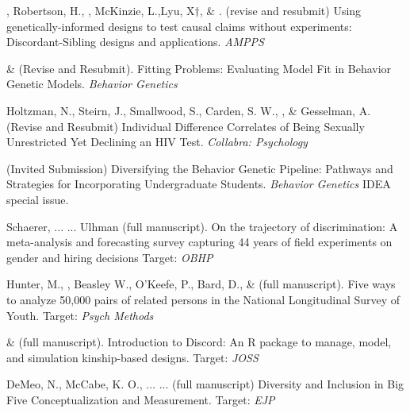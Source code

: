 

\item \meb, Robertson, H.\noteA, \jt, McKinzie, L.,\noteA Lyu, X$\dagger$, \& \joe. (revise and resubmit) Using genetically-informed designs to test causal claims without experiments: Discordant-Sibling designs and applications. \href{https://osf.io/zpdwt/}{\small\color{blue}{osf.io/zpdwt/}} \textit{AMPPS} %

\item \meb \& \joe (Revise and Resubmit). Fitting Problems: Evaluating Model Fit in Behavior Genetic Models. \textit{Behavior Genetics}
\item Holtzman, N., Steirn, J., Smallwood, S., Carden, S. W., \meb, \& Gesselman, A. (Revise and Resubmit) Individual Difference Correlates of Being Sexually Unrestricted Yet Declining an HIV Test. \textit{Collabra: Psychology}%

\item \meb (Invited Submission) Diversifying the Behavior Genetic Pipeline: Pathways and Strategies for Incorporating Undergraduate Students. \textit{Behavior Genetics} IDEA special issue.


\item Schaerer, ... \meb ... Ulhman (full manuscript). On the trajectory of discrimination: A meta-analysis and forecasting survey capturing 44 years of field experiments on gender and hiring decisions  Target: \textit{OBHP}

\item Hunter, M., \meb, Beasley W., O'Keefe, P.,  Bard, D., \& \Joe (full manuscript). Five ways to analyze 50,000 pairs of related persons in the National Longitudinal Survey of Youth.  Target: \textit{Psych Methods}

\item \jt \& \meb (full manuscript). Introduction to Discord: An R package to manage, model, and simulation kinship-based designs. Target: \textit{JOSS}

\item DeMeo, N., McCabe, K. O., ... \meb ... (full manuscript) Diversity and Inclusion in Big Five Conceptualization and Measurement.  Target: \textit{EJP}

